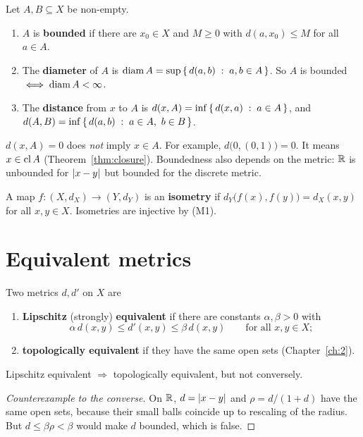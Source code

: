 \begin{definition}\label{def:bounded}
Let $A,B\subseteq X$ be non-empty.
\begin{enumerate}[label=(\roman*)]
  \item $A$ is \textbf{bounded} if there are $x_0\in X$ and $M\ge0$ with $d(a,x_0)\le M$ for all $a\in A$.
  \item The \textbf{diameter} of $A$ is $\operatorname{diam} A=\sup\left\{\, d(a,b) \;:\; a,b\in A \,\right\}$. So $A$ is bounded $\iff\operatorname{diam} A<\infty$.
  \item The \textbf{distance} from $x$ to $A$ is $d(x,A)=\inf\left\{\, d(x,a) \;:\; a\in A \,\right\}$, and $d(A,B)=\inf\left\{\, d(a,b) \;:\; a\in A,\ b\in B \,\right\}$.
\end{enumerate}
\end{definition}

\begin{warning}
$d(x,A)=0$ does \emph{not} imply $x\in A$. For example, $d\bigl(0,(0,1)\bigr)=0$. It means $x\in\operatorname{cl} A$ (Theorem~\ref{thm:closure}). Boundedness also depends on the metric: $\mathbb{R}$ is unbounded for $\left\lvert x-y\right\rvert$ but bounded for the discrete metric.
\end{warning}

\begin{definition}[Isometry]
A map $f\colon(X,d_X)\to(Y,d_Y)$ is an \textbf{isometry} if $d_Y\bigl(f(x),f(y)\bigr)=d_X(x,y)$ for all $x,y\in X$. Isometries are injective by \textup{(M1)}.
\end{definition}

\section{Equivalent metrics}
\begin{definition}\label{def:equiv}
Two metrics $d,d'$ on $X$ are
\begin{enumerate}[label=(\roman*)]
  \item \textbf{Lipschitz} (strongly) \textbf{equivalent} if there are constants $\alpha,\beta>0$ with
  \[ \alpha\,d(x,y)\le d'(x,y)\le\beta\,d(x,y)\qquad\text{for all }x,y\in X; \]
  \item \textbf{topologically equivalent} if they have the same open sets (Chapter~\ref{ch:2}).
\end{enumerate}
\end{definition}

\begin{proposition}
Lipschitz equivalent $\Rightarrow$ topologically equivalent, but not conversely.
\end{proposition}
\begin{proof}[Counterexample to the converse]
On $\mathbb{R}$, $d=\left\lvert x-y\right\rvert$ and $\rho=d/(1+d)$ have the same open sets, because their small balls coincide up to rescaling of the radius. But $d\le\beta\rho<\beta$ would make $d$ bounded, which is false.
\end{proof}

